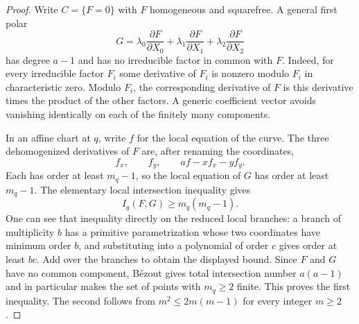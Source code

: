 \begin{proof}
Write $C=\{F=0\}$ with $F$ homogeneous and squarefree.  A general
first polar
\[
 G=\lambda_0\frac{\partial F}{\partial X_0}
   +\lambda_1\frac{\partial F}{\partial X_1}
   +\lambda_2\frac{\partial F}{\partial X_2}
\]
has degree $a-1$ and has no irreducible factor in common with $F$.
Indeed, for every irreducible factor $F_i$ some derivative of $F_i$
is nonzero modulo $F_i$ in characteristic zero.  Modulo $F_i$, the
corresponding derivative of $F$ is this derivative times the product
of the other factors.  A generic coefficient vector avoids
vanishing identically on each of the finitely many components.

In an affine chart at $q$, write $f$ for the local equation of the
curve.  The three dehomogenized derivatives of $F$ are, after
renaming the coordinates,
\[
 f_x,\qquad f_y,\qquad af-xf_x-yf_y.
\]
Each has order at least $m_q-1$, so the local equation of $G$ has
order at least $m_q-1$.  The elementary local intersection
inequality gives
\[
 I_q(F,G)\ge m_q(m_q-1).
\]
One can see that inequality directly on the reduced local branches:
a branch of multiplicity $b$ has a primitive parametrization whose
two coordinates have minimum order $b$, and substituting into a
polynomial of order $c$ gives order at least $bc$.  Add over the
branches to obtain the displayed bound.  Since $F$ and $G$ have no
common component, B\'ezout gives total intersection number $a(a-1)$
and in particular makes the set of points with $m_q\ge2$ finite.
This proves the first inequality.  The second follows from
$m^2\le2m(m-1)$ for every integer $m\ge2$.
\end{proof}
